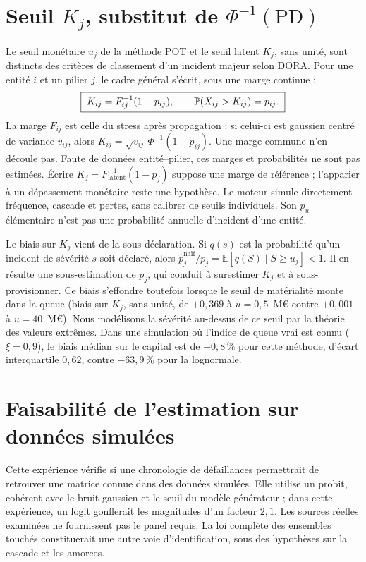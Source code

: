 
\section{Seuil $K_j$, substitut de $\Phi^{-1}(\mathrm{PD})$}

Le seuil monétaire $u_j$ de la méthode POT et le seuil latent $K_j$, sans unité,
sont distincts des critères de classement d'un incident majeur selon DORA.
Pour une entité $i$ et un pilier $j$, le cadre général s'écrit, sous une marge continue :
\begin{equation}
\label{eq:Kj}
\boxed{\;K_{ij}=F_{ij}^{-1}(1-p_{ij}),\qquad \mathbb{P}(X_{ij}>K_{ij})=p_{ij}.\;}
\end{equation}
La marge $F_{ij}$ est celle du stress après propagation : si celui-ci est gaussien centré de
variance $v_{ij}$, alors $K_{ij}=\sqrt{v_{ij}}\,\Phi^{-1}(1-p_{ij})$. Une marge commune n'en
découle pas. Faute de données entité--pilier, ces marges et probabilités ne sont pas estimées.
Écrire $K_j=F_{\mathrm{latent}}^{-1}(1-p_j)$ suppose une marge de référence ; l'apparier à un
dépassement monétaire reste une hypothèse. Le moteur simule directement fréquence, cascade et
pertes, sans calibrer de seuils individuels. Son $p_u$ élémentaire n'est pas une probabilité
annuelle d'incident d'une entité.

Le biais sur $K_j$ vient de la sous-déclaration. Si $q(s)$ est la
probabilité qu'un incident de sévérité $s$ soit déclaré, alors
$\hat p_j^{\text{naïf}}/p_j=\mathbb E[q(S)\mid S\ge u_j]<1$. Il en résulte une sous-estimation de
$p_j$, qui conduit à surestimer $K_j$ et à sous-provisionner. Ce biais s'effondre toutefois lorsque
le seuil de matérialité monte dans la queue (biais sur $K_j$, sans unité, de $+0{,}369$ à $u=0{,}5$~M\euro{} contre
$+0{,}001$ à $u=40$~M\euro{}). Nous modélisons la sévérité au-dessus de ce seuil par la théorie des valeurs
extrêmes. Dans une simulation où l'indice de queue vrai est connu ($\xi=0{,}9$), le biais médian
sur le capital est de $-0{,}8\,\%$ pour cette méthode, d'écart interquartile $0{,}62$, contre
$-63{,}9\,\%$ pour la lognormale.


\section{Faisabilité de l'estimation sur données simulées}
\label{sec:calib-cascade}

Cette expérience vérifie si une chronologie de défaillances permettrait de retrouver une
matrice connue dans des données simulées. Elle utilise un probit, cohérent avec le bruit gaussien
et le seuil du modèle générateur ; dans cette expérience, un logit gonflerait les magnitudes
d'un facteur $2{,}1$. Les sources réelles examinées ne fournissent pas le panel requis.
La loi complète des ensembles touchés constituerait une autre voie d'identification, sous
des hypothèses sur la cascade et les amorces.

